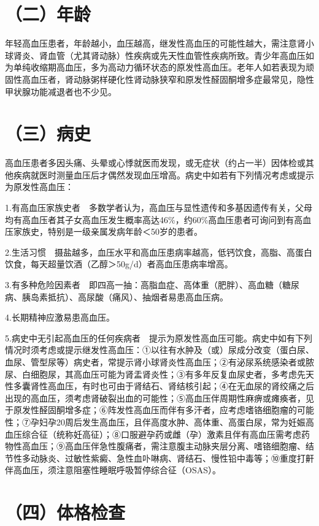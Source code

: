 \section{（二）年龄}

年轻高血压患者，年龄越小，血压越高，继发性高血压的可能性越大，需注意肾小球肾炎、肾血管（尤其肾动脉）性疾病或先天性血管性疾病所致。青少年高血压如为单纯收缩期高血压，多为高动力循环状态的原发性高血压。老年人如若表现为顽固性高血压者，肾动脉粥样硬化性肾动脉狭窄和原发性醛固酮增多症最常见，隐性甲状腺功能减退者也不少见。

\section{（三）病史}

高血压患者多因头痛、头晕或心悸就医而发现，或无症状（约占一半）因体检或其他疾病就医时测量血压后才偶然发现血压增高。病史中如若有下列情况考虑或提示为原发性高血压：

1.有高血压家族史者　多数学者认为，高血压与显性遗传和多基因遗传有关，父母均有高血压者其子女高血压发生概率高达46\%，约60\%高血压患者可询问到有高血压家族史，特别是一级亲属发病年龄＜50岁的患者。

2.生活习惯　摄盐越多，血压水平和高血压患病率越高，低钙饮食，高脂、高蛋白饮食，每天超量饮酒（乙醇＞50g/d）者高血压患病率增高。

3.有多种危险因素者　即四高一抽：高脂血症、高体重（肥胖）、高血糖（糖尿病、胰岛素抵抗）、高尿酸（痛风）、抽烟者易患高血压病。

4.长期精神应激易患高血压。

5.病史中无引起高血压的任何疾病者　提示为原发性高血压可能。病史中如有下列情况时须考虑或提示继发性高血压：①以往有水肿及（或）尿成分改变（蛋白尿、血尿、管型尿等）病史者，常提示肾小球肾炎性高血压；②有泌尿系统感染者或脓尿、白细胞尿，其高血压可能为肾盂肾炎性；③有多年反复血尿史者，多考虑先天性多囊肾性高血压，有时也可由于肾结石、肾结核引起；④在无血尿的肾绞痛之后出现的高血压，须考虑肾破裂出血的可能性；⑤高血压伴周期性麻痹或瘫痪者，见于原发性醛固酮增多症；⑥阵发性高血压而伴有多汗者，应考虑嗜铬细胞瘤的可能性；⑦孕妇孕20周后发生高血压，且伴高度水肿、高体重、高蛋白尿，常为妊娠高血压综合征（统称妊高征）；⑧口服避孕药或雌（孕）激素且伴有高血压需考虑药物性高血压；⑨高血压伴急性腹痛者，需注意腹主动脉夹层分离、嗜铬细胞瘤、结节性多动脉炎、过敏性紫癜、急性血卟啉病、肾结石、慢性铅中毒等；⑩重度打鼾伴高血压，须注意阻塞性睡眠呼吸暂停综合征（OSAS）。

\section{（四）体格检查}

